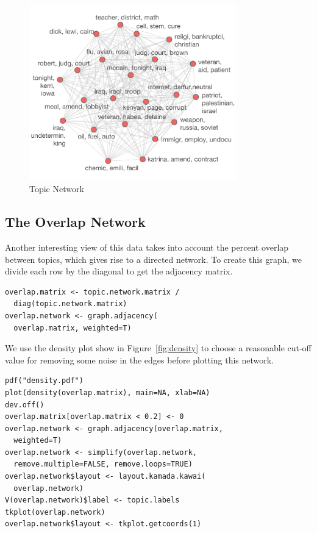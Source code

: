 \documentclass[%
	final,
	notitlepage,
	narroweqnarray,
	inline,
	]{ieee}
\begin{document}
\begin{figure}
\centering
\includegraphics[width=90mm]{topic-network.pdf}
\caption{Topic Network}
\label{fig:topic-network}
\end{figure}



\subsection{The Overlap Network}

\PARstart Another interesting view of this data takes into account the 
percent overlap between topics, which gives rise to a directed network.
To create this graph, we divide each row by the diagonal to get the
adjacency matrix.

\begin{verbatim}
overlap.matrix <- topic.network.matrix / 
  diag(topic.network.matrix)
overlap.network <- graph.adjacency(
  overlap.matrix, weighted=T)
\end{verbatim}

We use the density plot show in Figure~\ref{fig:density} to choose
a reasonable cut-off value for removing some noise in the edges before plotting this
network.  

\begin{verbatim}
pdf("density.pdf")
plot(density(overlap.matrix), main=NA, xlab=NA)
dev.off()
overlap.matrix[overlap.matrix < 0.2] <- 0
overlap.network <- graph.adjacency(overlap.matrix, 
  weighted=T)
overlap.network <- simplify(overlap.network, 
  remove.multiple=FALSE, remove.loops=TRUE)
overlap.network$layout <- layout.kamada.kawai(
  overlap.network)
V(overlap.network)$label <- topic.labels
tkplot(overlap.network)
overlap.network$layout <- tkplot.getcoords(1)
\end{verbatim}
\end{document}
